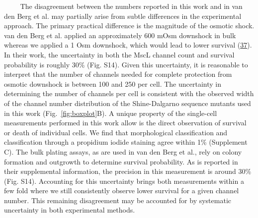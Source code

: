 ~~~~
The
disagreement
between
the
numbers
reported
in
this
work
and in
van
den
Berg
et al.
may
partially
arise
from
subtle
differences
in the
experimental
approach.
The
primary
practical
difference
is the
magnitude
of the
osmotic
shock.
van
den
Berg
et al.
applied
an
approximately
600
mOsm
downshock
in
bulk
whereas
we
applied
a 1
Osm
downshock,
which
would
lead
to
lower
survival
(\protect\hyperlink{ref-levina1999}{37}).
In
their
work,
the
uncertainty
in
both
the
MscL
channel
count
and
survival
probability
is
roughly
30\%
(Fig.
S14).
Given
this
uncertainty,
it is
reasonable
to
interpret
that
the
number
of
channels
needed
for
complete
protection
from
osmotic
downshock
is
between
100
and
250
per
cell.
The
uncertainty
in
determining
the
number
of
channels
per
cell
is
consistent
with
the
observed
width
of the
channel
number
distribution
of the
Shine-Dalgarno
sequence
mutants
used
in
this
work
(Fig.~\ref{fig:boxplot}B).
A
unique
property
of the
single-cell
measurements
performed
in
this
work
allow
is the
direct
observation
of
survival
or
death
of
individual
cells.
We
find
that
morphological
classification
and
classification
through
a
propidium
iodide
staining
agree
within
1\%
(Supplement
C).
The
bulk
plating
assays,
as are
used
in van
den
Berg
et
al.,
rely
on
colony
formation
and
outgrowth
to
determine
survival
probability.
As is
reported
in
their
supplemental
information,
the
precision
in
this
measurement
is
around
30\%
(Fig.
S14).
Accounting
for
this
uncertainty
brings
both
measurements
within
a few
fold
where
we
still
consistently
observe
lower
survival
for a
given
channel
number.
This
remaining
disagreement
may be
accounted
for by
systematic
uncertainty
in
both
experimental
methods.

